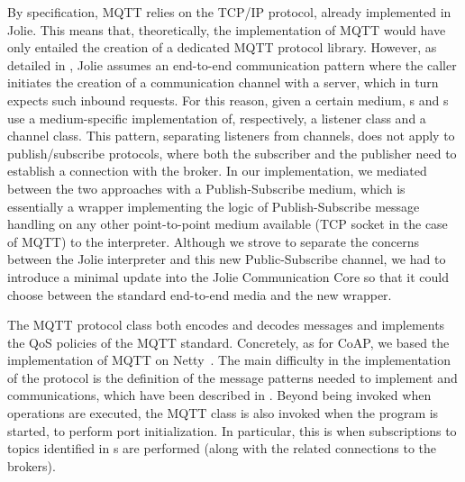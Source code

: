 By specification, MQTT relies on the TCP/IP protocol, already implemented in
Jolie. This means that, theoretically, the implementation of MQTT would have
only entailed the creation of a dedicated MQTT protocol library. However, as
detailed in , Jolie assumes an end-to-end
communication pattern where the caller initiates the creation of a
communication channel with a server, which in turn expects such inbound
requests. For this reason, given a certain medium, s and
s use a medium-specific implementation of, respectively, a
listener class and a channel class.
%
This pattern, separating listeners from channels, does not apply to
publish/subscribe protocols, where both the subscriber and the publisher need
to establish a connection with the broker. In our implementation, we mediated
between the two approaches with a Publish-Subscribe medium, which is
essentially a wrapper implementing the logic of Publish-Subscribe message
handling on any other point-to-point medium available (TCP socket in the case
of MQTT) to the interpreter. Although we strove to separate the concerns
between the Jolie interpreter and this new Public-Subscribe channel, we had to
introduce a minimal update into the Jolie \textsf{Communication Core} so that it could
choose between the standard end-to-end media and the new wrapper.

The MQTT protocol class both encodes and decodes messages and implements the QoS
policies of the MQTT standard. Concretely, as for CoAP, we based the
implementation of MQTT on Netty~\cite{maurer16}. The main difficulty in the
implementation of the protocol is the definition of the message patterns needed
to implement  and  communications, which have
been described in . Beyond being invoked when operations are executed, the
MQTT class is also invoked when the program is started, to perform port
initialization. In particular, this is when subscriptions to topics identified
in s are performed (along with the related connections to the
brokers).